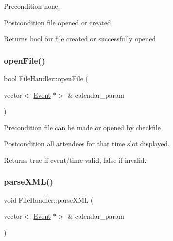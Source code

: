 \begin{DoxyPrecond}{Precondition}
none. 
\end{DoxyPrecond}
\begin{DoxyPostcond}{Postcondition}
file opened or created 
\end{DoxyPostcond}
\begin{DoxyReturn}{Returns}
bool for file created or successfully opened 
\end{DoxyReturn}
\mbox{\label{class_file_handler_aafa501a072bedae110a41b984811c83e}} 
\subsubsection{\texorpdfstring{open\+File()}{openFile()}}
{\footnotesize\ttfamily bool File\+Handler\+::open\+File (\begin{DoxyParamCaption}\item[{vector$<$ \hyperlink{class_event}{Event} $\ast$$>$ \&}]{calendar\+\_\+param }\end{DoxyParamCaption})}

\begin{DoxyPrecond}{Precondition}
file can be made or opened by checkfile 
\end{DoxyPrecond}
\begin{DoxyPostcond}{Postcondition}
all attendees for that time slot displayed. 
\end{DoxyPostcond}
\begin{DoxyReturn}{Returns}
true if event/time valid, false if invalid. 
\end{DoxyReturn}
\mbox{\label{class_file_handler_a1ac7349befc2f28e3b84f4628cb34dd1}} 
\subsubsection{\texorpdfstring{parse\+X\+M\+L()}{parseXML()}}
{\footnotesize\ttfamily void File\+Handler\+::parse\+X\+ML (\begin{DoxyParamCaption}\item[{vector$<$ \hyperlink{class_event}{Event} $\ast$$>$ \&}]{calendar\+\_\+param }\end{DoxyParamCaption})\hspace{0.3cm}{\ttfamily [private]}}

